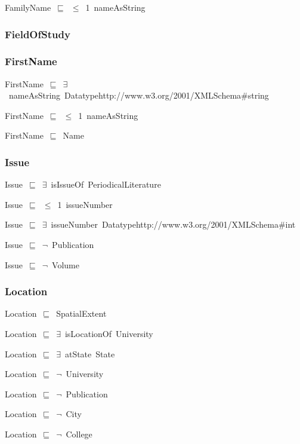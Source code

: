 \documentclass{article}
\begin{document}
FamilyName~\ensuremath{\sqsubseteq}~\ensuremath{\leq}~1~nameAsString~

\subsubsection*{FieldOfStudy}

\subsubsection*{FirstName}

FirstName~\ensuremath{\sqsubseteq}~\ensuremath{\exists}~nameAsString~Datatypehttp://www.w3.org/2001/XMLSchema#string~

FirstName~\ensuremath{\sqsubseteq}~\ensuremath{\leq}~1~nameAsString~

FirstName~\ensuremath{\sqsubseteq}~Name~

\subsubsection*{Issue}

Issue~\ensuremath{\sqsubseteq}~\ensuremath{\exists}~isIssueOf~PeriodicalLiterature~

Issue~\ensuremath{\sqsubseteq}~\ensuremath{\leq}~1~issueNumber~

Issue~\ensuremath{\sqsubseteq}~\ensuremath{\exists}~issueNumber~Datatypehttp://www.w3.org/2001/XMLSchema#int~

Issue~\ensuremath{\sqsubseteq}~\ensuremath{\lnot}~Publication

Issue~\ensuremath{\sqsubseteq}~\ensuremath{\lnot}~Volume

\subsubsection*{Location}

Location~\ensuremath{\sqsubseteq}~SpatialExtent~

Location~\ensuremath{\sqsubseteq}~\ensuremath{\exists}~isLocationOf~University~

Location~\ensuremath{\sqsubseteq}~\ensuremath{\exists}~atState~State~

Location~\ensuremath{\sqsubseteq}~\ensuremath{\lnot}~University

Location~\ensuremath{\sqsubseteq}~\ensuremath{\lnot}~Publication

Location~\ensuremath{\sqsubseteq}~\ensuremath{\lnot}~City

Location~\ensuremath{\sqsubseteq}~\ensuremath{\lnot}~College
\end{document}
